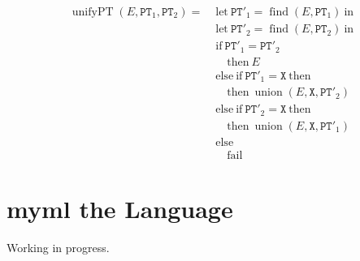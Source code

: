 \documentclass{report}
\newcommand{\theLang}{myml}
\newcommand{\code}{\mathtt}
\DeclareMathOperator{\union}{union}
\DeclareMathOperator{\find}{find}
\DeclareMathOperator{\unifyPresenceWithType}{unifyPT}
\begin{document}
\begin{align*}
\unifyPresenceWithType(E, \code{PT}_1, \code{PT}_2) = \;
& \text{let}\ \code{PT}'_1 = \find(E, \code{PT}_1)\ \text{in} \\
& \text{let}\ \code{PT}'_2 = \find(E, \code{PT}_2)\ \text{in} \\
& \text{if}\ \code{PT}'_1 = \code{PT}'_2 \\
& \quad \text{then}\ E \\
& \text{else}\ \text{if}\ \code{PT}'_1 = \code{X}\ \text{then} \\
& \quad \text{then}\ \union(E, \code{X}, \code{PT}'_2) \\
& \text{else}\ \text{if}\ \code{PT}'_2 = \code{X}\ \text{then} \\
& \quad \text{then}\ \union(E, \code{X}, \code{PT}'_1) \\
& \text{else} \\
& \quad \text{fail}
\end{align*}

\chapter{\theLang{} the Language}

Working in progress.
\end{document}
